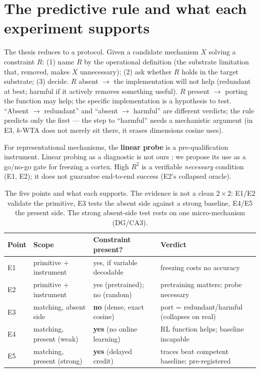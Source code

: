 \documentclass[11pt]{article}
\begin{document}
\section{The predictive rule and what each experiment supports}
The thesis reduces to a protocol. Given a candidate mechanism $X$ solving a constraint $R$: (1) name $R$ by the operational definition (the substrate limitation that, removed, makes $X$ unnecessary); (2) ask whether $R$ holds in the target substrate; (3) decide. $R$ absent $\to$ the implementation will not help (redundant at best; harmful if it actively removes something useful). $R$ present $\to$ porting the function may help; the specific implementation is a hypothesis to test. ``Absent $\to$ redundant'' and ``absent $\to$ harmful'' are different verdicts; the rule predicts only the first --- the step to ``harmful'' needs a mechanistic argument (in E3, $k$-WTA does not merely sit there, it erases dimensions cosine uses).

For representational mechanisms, the \textbf{linear probe} is a pre-qualification instrument. Linear probing as a diagnostic is not ours \citep{alain2016, hewitt2019}; we propose its use as a go/no-go gate for freezing a cortex. High $R^2$ is a verifiable \emph{necessary} condition (E1, E2); it does not guarantee end-to-end success (E2's collapsed oracle).

\begin{table}[t]
\centering\small
\begin{tabular}{@{}llll@{}}
\toprule
Point & Scope & Constraint present? & Verdict \\
\midrule
E1 & primitive + instrument & yes, if variable decodable & freezing costs no accuracy \\
E2 & primitive + instrument & yes (pretrained); no (random) & pretraining matters; probe necessary \\
E3 & matching, absent side & \textbf{no} (dense, exact cosine) & port = redundant/harmful (collapses on real) \\
E4 & matching, present (weak) & \textbf{yes} (no online learning) & RL function helps; baseline incapable \\
E5 & matching, present (strong) & \textbf{yes} (delayed credit) & traces beat competent baseline; pre-registered \\
\bottomrule
\end{tabular}
\caption{The five points and what each supports. The evidence is not a clean $2{\times}2$: E1/E2 validate the primitive, E3 tests the absent side against a strong baseline, E4/E5 the present side. The strong absent-side test rests on one micro-mechanism (DG/CA3).}
\end{table}
\end{document}
